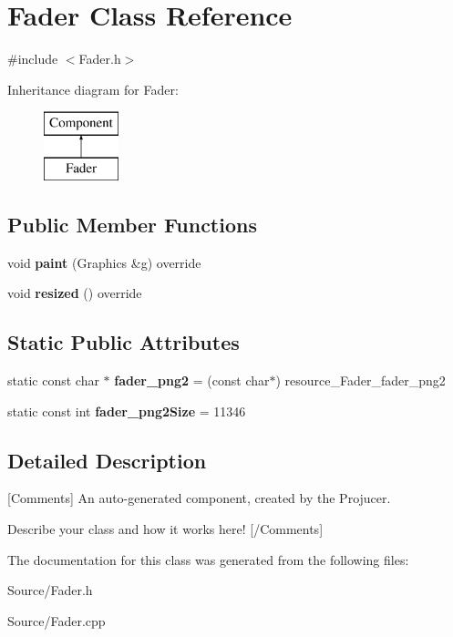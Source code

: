 \hypertarget{class_fader}{}\section{Fader Class Reference}
\label{class_fader}


{\ttfamily \#include $<$Fader.\+h$>$}

Inheritance diagram for Fader\+:\begin{figure}[H]
\begin{center}
\leavevmode
\includegraphics[height=2.000000cm]{class_fader}
\end{center}
\end{figure}
\subsection*{Public Member Functions}
\begin{DoxyCompactItemize}
\item 
\mbox{\label{class_fader_ab5567cbcfc57bbb8ee05e13de0b6513d}} 
void {\bfseries paint} (Graphics \&g) override
\item 
\mbox{\label{class_fader_a4e4adfe35518c2e3883d8c2103c20ea9}} 
void {\bfseries resized} () override
\end{DoxyCompactItemize}
\subsection*{Static Public Attributes}
\begin{DoxyCompactItemize}
\item 
\mbox{\label{class_fader_a4611c26183a433e6ead50d8a41db2c9f}} 
static const char $\ast$ {\bfseries fader\+\_\+png2} = (const char$\ast$) resource\+\_\+\+Fader\+\_\+fader\+\_\+png2
\item 
\mbox{\label{class_fader_a2bbcdf4db6d69b26c2ddd6ece7086fba}} 
static const int {\bfseries fader\+\_\+png2\+Size} = 11346
\end{DoxyCompactItemize}


\subsection{Detailed Description}
\mbox{[}Comments\mbox{]} An auto-\/generated component, created by the Projucer.

Describe your class and how it works here! \mbox{[}/\+Comments\mbox{]} 

The documentation for this class was generated from the following files\+:\begin{DoxyCompactItemize}
\item 
Source/Fader.\+h\item 
Source/Fader.\+cpp\end{DoxyCompactItemize}
